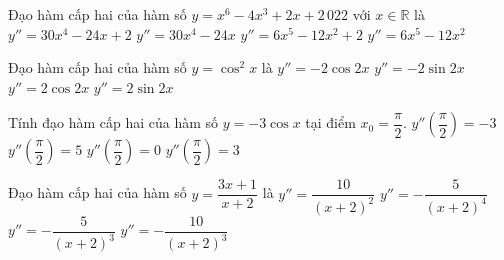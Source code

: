 

\begin{ex}%
	 Đạo hàm cấp hai của hàm số $y=x^6-4x^3+2x+2\,022$ với $x\in\mathbb{R}$ là
	\choice 
		{$y''=30x^4-24x+2$} 
		{\True $y''=30x^4-24x$} 
		 {$y''=6x^5-12x^2+2$}
		 {$y''=6x^5-12x^2$}
\end{ex}

\begin{ex}%
	Đạo hàm cấp hai của hàm  số $y=\cos^2x$ là
	\choice 
		 {\True $y''=-2\cos 2x$}
		{$y''=-2\sin  2x$}
		{$y''=2\cos  2x$}
		{$y''=2\sin  2x$}
\end{ex}

\begin{ex}%
	Tính đạo hàm cấp hai của hàm số $y=-3\cos x$ tại điểm $x_0=\dfrac{\pi}{2}$. 
	\choice 
		{$y''\left(\dfrac{\pi}{2}\right)=-3$} 
		 {$y''\left(\dfrac{\pi}{2}\right)=5$}
		{\True $y''\left(\dfrac{\pi}{2}\right)=0$} 
		{$y''\left(\dfrac{\pi}{2}\right)=3$} 
\end{ex}

\begin{ex}%
	Đạo hàm  cấp hai của hàm số $y=\dfrac{3x+1}{x+2}$ là
	 \choice
		 {$y''=\dfrac{10}{(x+2)^2}$}
		{$y''=-\dfrac{5}{(x+2)^4}$} 
		{$y''=-\dfrac{5}{(x+2)^3}$} 
		 {\True $y''=-\dfrac{10}{(x+2)^3}$}
\end{ex}

